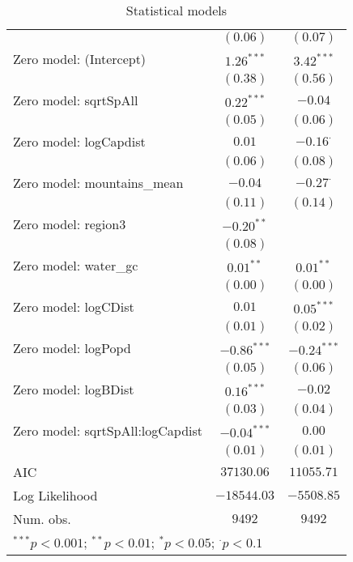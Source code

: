 \begin{table}
\begin{center}
{\begin{tabular}{l c c}
                                  & $(0.06)$      & $(0.07)$        \\
Zero model: (Intercept)           & $1.26^{***}$  & $3.42^{***}$    \\
                                  & $(0.38)$      & $(0.56)$        \\
Zero model: sqrtSpAll             & $0.22^{***}$  & $-0.04$         \\
                                  & $(0.05)$      & $(0.06)$        \\
Zero model: logCapdist            & $0.01$        & $-0.16^{\cdot}$ \\
                                  & $(0.06)$      & $(0.08)$        \\
Zero model: mountains\_mean       & $-0.04$       & $-0.27^{\cdot}$ \\
                                  & $(0.11)$      & $(0.14)$        \\
Zero model: region3               & $-0.20^{**}$  &                 \\
                                  & $(0.08)$      &                 \\
Zero model: water\_gc             & $0.01^{**}$   & $0.01^{**}$     \\
                                  & $(0.00)$      & $(0.00)$        \\
Zero model: logCDist              & $0.01$        & $0.05^{***}$    \\
                                  & $(0.01)$      & $(0.02)$        \\
Zero model: logPopd               & $-0.86^{***}$ & $-0.24^{***}$   \\
                                  & $(0.05)$      & $(0.06)$        \\
Zero model: logBDist              & $0.16^{***}$  & $-0.02$         \\
                                  & $(0.03)$      & $(0.04)$        \\
Zero model: sqrtSpAll:logCapdist  & $-0.04^{***}$ & $0.00$          \\
                                  & $(0.01)$      & $(0.01)$        \\
\midrule
AIC                               & $37130.06$    & $11055.71$      \\
Log Likelihood                    & $-18544.03$   & $-5508.85$      \\
Num. obs.                         & $9492$        & $9492$          \\
\bottomrule
\multicolumn{3}{l}{\scriptsize{$^{***}p<0.001$; $^{**}p<0.01$; $^{*}p<0.05$; $^{\cdot}p<0.1$}}
\end{tabular}
}
\caption{Statistical models}
\label{zinb}
\end{center}
\end{table}
